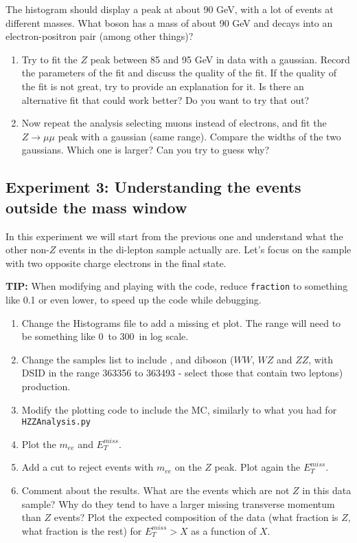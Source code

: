 \begin{remark}
The histogram should display a peak at about 90 GeV, with a lot of events at different masses. What boson has a mass of about 90 GeV and decays into an electron-positron pair (among other things)? \end{remark}


\begin{enumerate} [resume]
\item Try to fit the $Z$ peak between 85 and 95 GeV in data with a gaussian. Record the parameters of the fit and discuss the quality of the fit. If the quality of the fit is not great, try to provide an explanation for it. Is there an alternative fit that could work better? Do you want to try that out? 
\item  Now repeat the analysis selecting muons instead of electrons, and fit the $Z\rightarrow \mu\mu$ peak with a gaussian (same range). Compare the widths of the two gaussians. Which one is larger? Can you try to guess why?  
\end{enumerate}

\subsection{Experiment 3: Understanding the events outside the mass window}

In this experiment we will start from the previous one and understand what the other non-$Z$ events in the di-lepton sample actually are. Let's focus on the sample with two opposite charge electrons in the final state. 

\begin{remark}
\textbf{TIP:} When modifying and playing with the code, reduce \verb|fraction| to something like 0.1 or even lower, to speed up the code while debugging.
\end{remark}


\begin{enumerate} 
\item Change the Histograms file to add a missing et plot. The range will need to be something like 0\ \GeV to 300\ \GeV in log scale. 
\item Change the samples list to include \ttbar, and diboson ($WW$, $WZ$ and $ZZ$, with DSID in the range 363356 to 363493 - select those that contain two leptons) production.   
\item Modify the plotting code to include the MC, similarly to what you had for \verb|HZZAnalysis.py|
\item Plot the $m_{ee}$ and $E_{T}^{miss}$.
\item Add a cut to reject events with $m_{ee}$ on the $Z$ peak. Plot again the $E_{T}^{miss}$. 
\item Comment about the results. What are the events which are not $Z$ in this data sample? Why do they tend to have a larger missing transverse momentum than $Z$ events?  Plot the expected composition of the data (what fraction is $Z$, what fraction is the rest) for $ E_{T}^{miss} > X$ as a function of $X$.
\end{enumerate}


